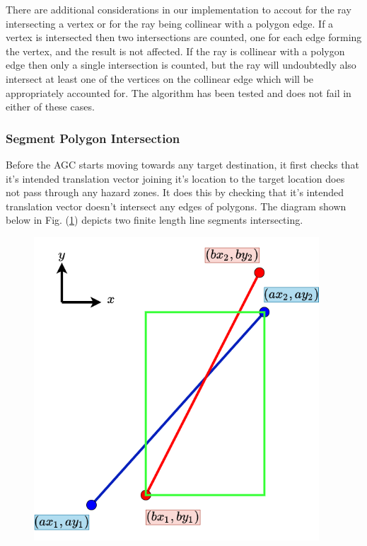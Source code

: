 \documentclass[11pt,landscape]{article}
\begin{document}
\begin{multicols}{3}
There are additional considerations in our implementation to accout for the ray
intersecting a vertex or for the ray being collinear with a polygon edge. If a
vertex is intersected then two intersections are counted, one for each edge
forming the vertex, and the result is not affected. If the ray is collinear with
a polygon edge then only a single intersection is counted, but the ray will
undoubtedly also intersect at least one of the vertices on the collinear edge
which will be appropriately accounted for. The algorithm has been tested and
does not fail in either of these cases.

\subsubsection{Segment Polygon Intersection}
Before the AGC starts moving towards any target destination, it first checks
that it's intended translation vector joining it's location to the target
location does not pass through any hazard zones. It does this by checking that
it's intended translation vector doesn't intersect any edges of polygons. The
diagram shown below in Fig. (\ref{fig:segment_intersection}) depicts two finite
length line segments intersecting.
\begin{figure}[H]
    \begin{mdframed}
        \begin{center}
            \includegraphics[width=0.95\textwidth]{segment_intersection.png}
        \end{center}
    \end{mdframed}
    \label{fig:segment_intersection}
\end{figure}
 

\end{multicols}
\end{document}

